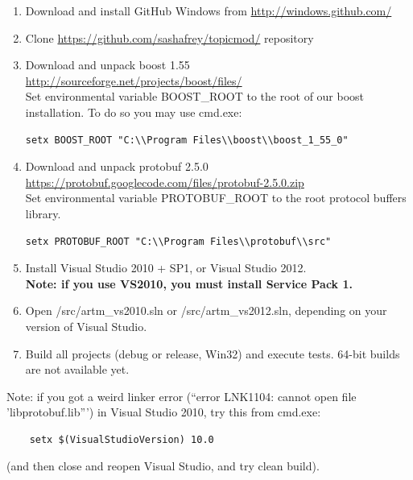 \documentclass[11pt,a4paper,twoside]{report}
\begin{document}
\begin{enumerate}
   \item Download and install GitHub Windows from \url{http://windows.github.com/}
   \item Clone \url{https://github.com/sashafrey/topicmod/} repository
   \item Download and unpack boost 1.55  \\
         \url{http://sourceforge.net/projects/boost/files/} \\
         Set environmental variable BOOST\_ROOT to the root of our boost installation.
         To do so you may use cmd.exe:
\begin{verbatim}
setx BOOST_ROOT "C:\\Program Files\\boost\\boost_1_55_0"
\end{verbatim}
   \item Download and unpack protobuf 2.5.0 \\
         \url{https://protobuf.googlecode.com/files/protobuf-2.5.0.zip} \\
         Set environmental variable PROTOBUF\_ROOT to the root protocol buffers library.
\begin{verbatim}
setx PROTOBUF_ROOT "C:\\Program Files\\protobuf\\src"
\end{verbatim}
    \item Install Visual Studio 2010 + SP1, or Visual Studio 2012. \\
    {\bf Note: if you use VS2010, you must install Service Pack 1.}
    \item Open /src/artm\_vs2010.sln or /src/artm\_vs2012.sln, depending on your version of Visual Studio.
    \item Build all projects (debug or release, Win32) and execute tests. 64-bit builds are not available yet.
\end{enumerate}

Note: if you got a weird linker error (``error LNK1104: cannot open file 'libprotobuf.lib''')
      in Visual Studio 2010, try this from cmd.exe:
\begin{verbatim}
    setx $(VisualStudioVersion) 10.0
\end{verbatim}
(and then close and reopen Visual Studio, and try clean build).
\end{document}
